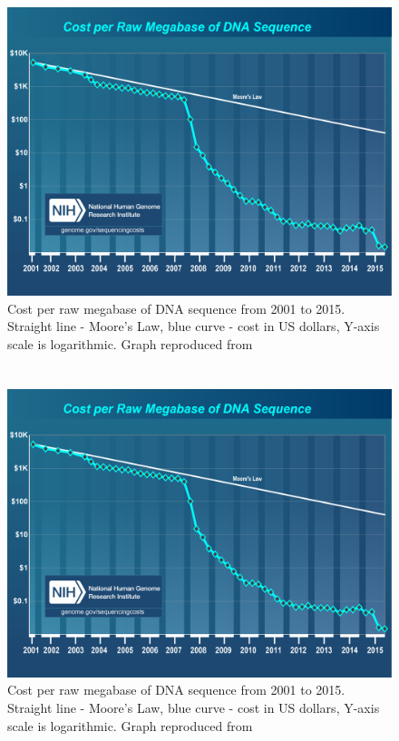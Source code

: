 \chapter[Appendix]{}
\begin{figure}[hb!]
\begin{center}
\includegraphics[scale=0.5]{costperMb2015_4.jpg}
\end{center}
\caption[Cost per raw megabase of DNA sequence from 2001 to 2015]{Cost per raw megabase of DNA sequence from 2001 to 2015. Straight line - Moore's Law, blue curve - cost in US dollars, Y-axis scale is logarithmic. Graph reproduced from \citep{wetterstrand2016}}
\end{figure}

\chapter[Appendix]{}
\begin{figure}[hb!]
\begin{center}
\includegraphics[scale=0.5]{costperMb2015_4.jpg}
\end{center}
\caption[Cost per raw megabase of DNA sequence from 2001 to 2015]{Cost per raw megabase of DNA sequence from 2001 to 2015. Straight line - Moore's Law, blue curve - cost in US dollars, Y-axis scale is logarithmic. Graph reproduced from \citep{wetterstrand2016}}
\end{figure}

